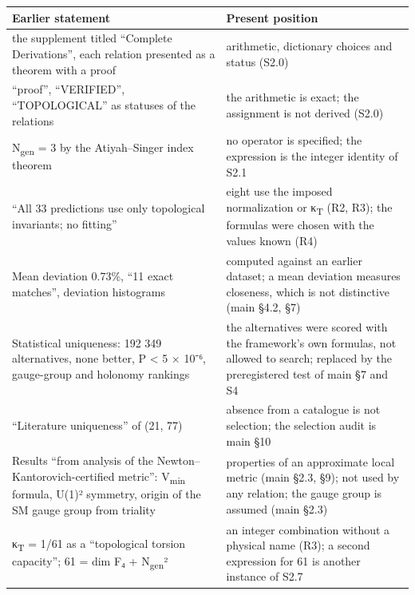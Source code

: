 \documentclass[11pt,a4paper]{article}
\begin{document}
\begin{longtable}[]{@{}
  >{\raggedright\arraybackslash}p{}
  >{\raggedright\arraybackslash}p{}@{}}
\toprule\noalign{}
\begin{minipage}[b]{\linewidth}\raggedright
Earlier statement
\end{minipage} & \begin{minipage}[b]{\linewidth}\raggedright
Present position
\end{minipage} \\
\midrule\noalign{}
\endhead
\bottomrule\noalign{}
\endlastfoot
the supplement titled ``Complete Derivations'', each relation presented as a theorem with a proof & arithmetic, dictionary choices and status (S2.0) \\
``proof'', ``VERIFIED'', ``TOPOLOGICAL'' as statuses of the relations & the arithmetic is exact; the assignment is not derived (S2.0) \\
N\textsubscript{gen} = 3 by the Atiyah--Singer index theorem & no operator is specified; the expression is the integer identity of S2.1 \\
``All 33 predictions use only topological invariants; no fitting'' & eight use the imposed normalization or κ\textsubscript{T} (R2, R3); the formulas were chosen with the values known (R4) \\
Mean deviation 0.73\%, ``11 exact matches'', deviation histograms & computed against an earlier dataset; a mean deviation measures closeness, which is not distinctive (main §4.2, §7) \\
Statistical uniqueness: 192 349 alternatives, none better, P \textless{} 5 × 10⁻⁶, gauge-group and holonomy rankings & the alternatives were scored with the framework's own formulas, not allowed to search; replaced by the preregistered test of main §7 and S4 \\
``Literature uniqueness'' of (21, 77) & absence from a catalogue is not selection; the selection audit is main §10 \\
Results ``from analysis of the Newton--Kantorovich-certified metric'': V\textsubscript{min} formula, U(1)² symmetry, origin of the SM gauge group from triality & properties of an approximate local metric (main §2.3, §9); not used by any relation; the gauge group is assumed (main §2.3) \\
κ\textsubscript{T} = 1/61 as a ``topological torsion capacity''; 61 = dim F₄ + N\textsubscript{gen}² & an integer combination without a physical name (R3); a second expression for 61 is another instance of S2.7 \\

\end{longtable}
\end{document}
